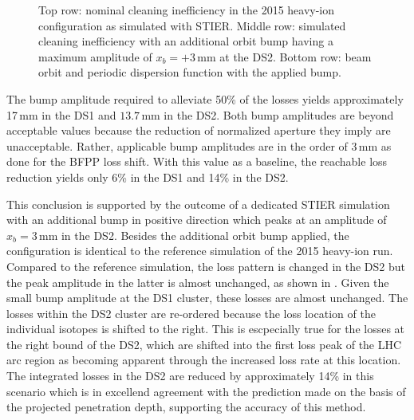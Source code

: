 \begin{figure}[t]
  \centering
  \caption{Top row: nominal cleaning inefficiency in the 2015 heavy-ion configuration as simulated with STIER. Middle row: simulated cleaning inefficiency with an additional orbit bump having a maximum amplitude of $x_b=+3\,$mm at the DS2. Bottom row: beam orbit and periodic dispersion function with the applied bump.}  
  \label{pic:16052701}
  \end{figure}



The bump amplitude required to alleviate 50\% of the losses yields approximately 17$\,$mm in the DS1 and $13.7\,$mm in the DS2. Both bump amplitudes are beyond acceptable values because the reduction of normalized aperture they imply are unacceptable. Rather, applicable bump amplitudes are in the order of 3$\,$mm as done for the BFPP loss shift. With this value as a baseline, the reachable loss reduction yields only 6\% in the DS1 and 14\% in the DS2. 

This conclusion is supported by the outcome of a dedicated STIER simulation with an additional bump in positive direction which peaks at an amplitude of $x_b=3\,$mm in the DS2. Besides the additional orbit bump applied, the configuration is identical to the reference simulation of the 2015 heavy-ion run. Compared to the reference simulation, the loss pattern is changed in the DS2 but the peak amplitude in the latter is almost unchanged, as shown in . Given the small bump amplitude at the DS1 cluster, these losses are almost unchanged. The losses within the DS2 cluster are re-ordered because the loss location of the individual isotopes is shifted to the right. This is escpecially true for the losses at the right bound of the DS2, which are shifted into the first loss peak of the LHC arc region as becoming apparent through the increased loss rate at this location. The integrated losses in the DS2 are reduced by approximately 14\% in this scenario which is in excellend agreement with the prediction made on the basis of the projected penetration depth, supporting the accuracy of this method. 

